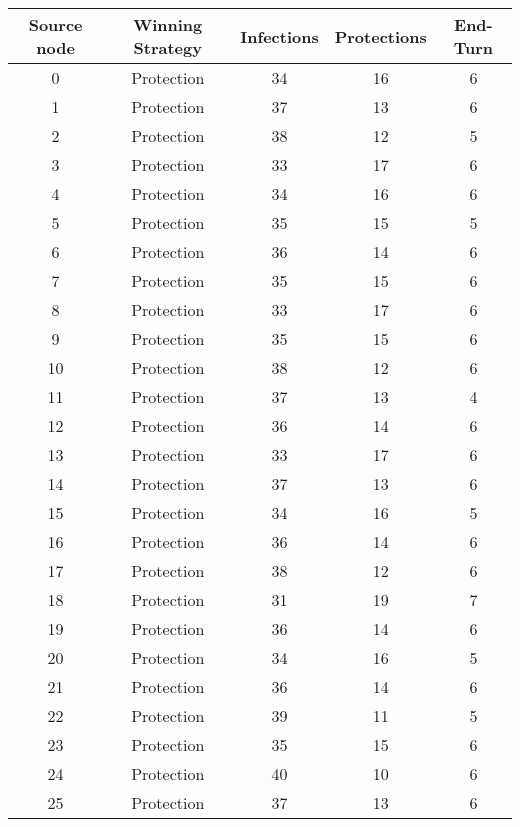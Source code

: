 \documentclass[results.tex]{subfiles}
\begin{document}
\begin{center}
  \begin{tabular}{| c || c | c | c | c |}
    \hline
    {\bfseries Source node} & {\bfseries Winning Strategy} & {\bfseries Infections} & {\bfseries Protections} & {\bfseries End-Turn} \\  %
    \hline\hline
    0 & Protection & 34 & 16 & 6 \\ 
    \hline
    1 & Protection & 37 & 13 & 6 \\ 
    \hline
    2 & Protection & 38 & 12 & 5 \\ 
    \hline
    3 & Protection & 33 & 17 & 6 \\ 
    \hline
    4 & Protection & 34 & 16 & 6 \\ 
    \hline
    5 & Protection & 35 & 15 & 5 \\ 
    \hline
    6 & Protection & 36 & 14 & 6 \\ 
    \hline
    7 & Protection & 35 & 15 & 6 \\ 
    \hline
    8 & Protection & 33 & 17 & 6 \\ 
    \hline
    9 & Protection & 35 & 15 & 6 \\ 
    \hline
    10 & Protection & 38 & 12 & 6 \\ 
    \hline
    11 & Protection & 37 & 13 & 4 \\ 
    \hline
    12 & Protection & 36 & 14 & 6 \\ 
    \hline
    13 & Protection & 33 & 17 & 6 \\ 
    \hline
    14 & Protection & 37 & 13 & 6 \\ 
    \hline
    15 & Protection & 34 & 16 & 5 \\ 
    \hline
    16 & Protection & 36 & 14 & 6 \\ 
    \hline
    17 & Protection & 38 & 12 & 6 \\ 
    \hline
    18 & Protection & 31 & 19 & 7 \\ 
    \hline
    19 & Protection & 36 & 14 & 6 \\ 
    \hline
    20 & Protection & 34 & 16 & 5 \\ 
    \hline
    21 & Protection & 36 & 14 & 6 \\ 
    \hline
    22 & Protection & 39 & 11 & 5 \\ 
    \hline
    23 & Protection & 35 & 15 & 6 \\ 
    \hline
    24 & Protection & 40 & 10 & 6 \\ 
    \hline
    25 & Protection & 37 & 13 & 6 \\ 

\end{tabular}
\end{center}
\end{document}
